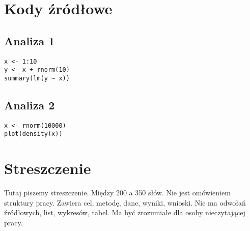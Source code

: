 \documentclass[12pt,a4paper,twoside,openany]{book}
\begin{document}
\clearpage
{}
\listoffigures

\clearpage
\listoftables
{}

\appendix
\chapter*{Kody źródłowe}

\section*{Analiza 1}
\begin{verbatim}
x <- 1:10
y <- x + rnorm(10)
summary(lm(y ~ x))
\end{verbatim}

\section*{Analiza 2}
\begin{verbatim}
x <- rnorm(10000)
plot(density(x))
\end{verbatim}

\clearpage

\chapter*{Streszczenie}

Tutaj piszemy streszczenie. Między 200 a 350 słów. Nie jest omówieniem struktury pracy. Zawiera cel, metodę, dane, wyniki, wnioski. Nie ma odwołań źródłowych, list, wykresów, tabel. Ma być zrozumiałe dla osoby nieczytającej pracy.
\end{document}
